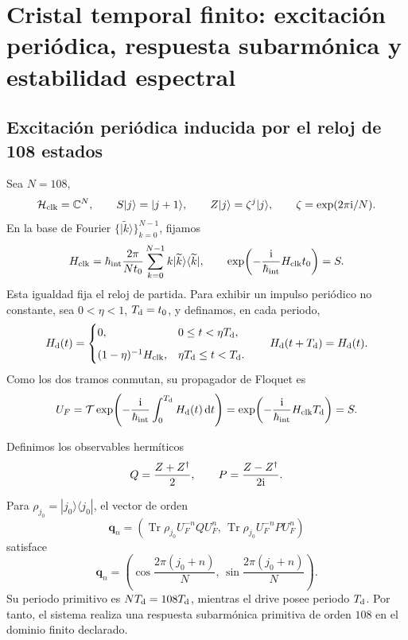 \section{Cristal temporal finito: excitación periódica, respuesta subarmónica y estabilidad espectral}
\label{v:sec:hmtf2-cristal-temporal}

\subsection{Excitación periódica inducida por el reloj de 108 estados}

Sea \(N=108\),
\[
 \mathcal H_{\rm clk}=\mathbb C^N,\qquad
 S|j\rangle=|j+1\rangle,\qquad
 Z|j\rangle=\zeta^j|j\rangle,\qquad
 \zeta=\exp(2\pi{\rm i}/N).
\]
En la base de Fourier \(\{|\widetilde k\rangle\}_{k=0}^{N-1}\), fijamos
\[
 H_{\rm clk}
 =\hbar_{\rm int}\frac{2\pi}{Nt_0}
 \sum_{k=0}^{N-1}k|\widetilde k\rangle\langle\widetilde k|,
 \qquad
 \exp\!\left(-\frac{{\rm i}}{\hbar_{\rm int}}H_{\rm clk}t_0\right)=S.
\]
Esta igualdad fija el reloj de partida. Para exhibir un impulso periódico no
constante, sea \(0<\eta<1\), \(T_{\rm d}=t_0\), y
definamos, en cada periodo,
\[
 H_{\rm d}(t)=
 \begin{cases}
  0,&0\leq t<\eta T_{\rm d},\\[2mm]
  (1-\eta)^{-1}H_{\rm clk},
  &\eta T_{\rm d}\leq t<T_{\rm d}.
 \end{cases}
 \qquad H_{\rm d}(t+T_{\rm d})=H_{\rm d}(t).
\]
Como los dos tramos conmutan, su propagador de Floquet es
\[
 U_F
 =\mathcal T\exp\!\left(
 -\frac{{\rm i}}{\hbar_{\rm int}}\int_0^{T_{\rm d}}H_{\rm d}(t)\,\mathrm dt
 \right)
 =\exp\!\left(-\frac{{\rm i}}{\hbar_{\rm int}}H_{\rm clk}T_{\rm d}\right)
 =S.
\]

Definimos los observables hermíticos
\[
 Q=\frac{Z+Z^\dagger}{2},
 \qquad
 P=\frac{Z-Z^\dagger}{2{\rm i}}.
\]

\begin{theorem}
\label{v:thm:hmtf2-subarmonia-108}
Para \(\rho_{j_0}=|j_0\rangle\langle j_0|\), el vector de orden
\[
 \mathbf q_n
 =\left(
 \operatorname{Tr}\rho_{j_0}U_F^{-n}QU_F^n,\,
 \operatorname{Tr}\rho_{j_0}U_F^{-n}PU_F^n
 \right)
\]
satisface
\[
 \mathbf q_n
 =\left(
 \cos\frac{2\pi(j_0+n)}N,\,
 \sin\frac{2\pi(j_0+n)}N
 \right).
\]
Su periodo primitivo es \(N T_{\rm d}=108T_{\rm d}\), mientras el drive
posee periodo \(T_{\rm d}\). Por tanto, el sistema realiza una respuesta
subarmónica primitiva de orden \(108\) en el dominio finito declarado.
\end{theorem}

